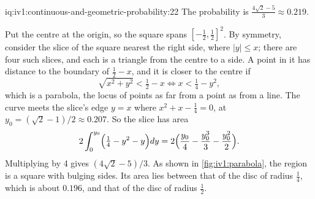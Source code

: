 \begin{solution}{iq:iv1:continuous-and-geometric-probability:22}
The probability is $\frac{4\sqrt{2} - 5}{3} \approx 0.219$.

Put the centre at the origin, so the square spans $[-\tfrac12, \tfrac12]^2$. By symmetry, consider the slice of the square nearest the right side, where $|y| \le x$; there are four such slices, and each is a triangle from the centre to a side. A point in it has distance to the boundary of $\tfrac12 - x$, and it is closer to the centre if
\[
\sqrt{x^2 + y^2} < \tfrac12 - x \iff x < \tfrac14 - y^2,
\]
which is a parabola, the locus of points as far from a point as from a line. The curve meets the slice's edge $y = x$ where $x^2 + x - \tfrac14 = 0$, at $y_0 = (\sqrt{2} - 1)/2 \approx 0.207$. So the slice has area
\[
2\int_0^{y_0} \Bigl(\tfrac14 - y^2 - y\Bigr) dy = 2\Bigl(\frac{y_0}{4} - \frac{y_0^3}{3} - \frac{y_0^2}{2}\Bigr).
\]
Multiplying by 4 gives $(4\sqrt{2} - 5)/3$. As shown in \cref{fig:iv1:parabola}, the region is a square with bulging sides. Its area lies between that of the disc of radius $\tfrac14$, which is about $0.196$, and that of the disc of radius $\tfrac12$.

\begin{omfigure}

\label{fig:iv1:parabola}
\end{omfigure}

\end{solution}

